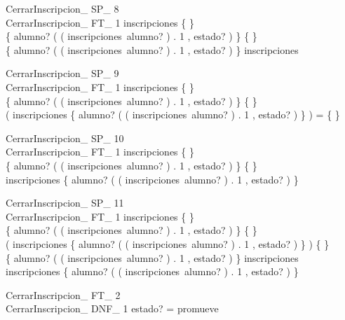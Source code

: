 \documentclass{article}
\begin{document}
 
 \begin{schema}{CerrarInscripcion\_ SP\_ 8}\\
  CerrarInscripcion\_ FT\_ 1 
 \where
  inscripciones \neq \{ \} \\
  \{ alumno? \mapsto ( ( inscripciones~alumno? ) . 1 , estado? ) \} \neq \{ \} \\
  \dom \{ alumno? \mapsto ( ( inscripciones~alumno? ) . 1 , estado? ) \} \subset \dom inscripciones
 \end{schema}
 
 
 \begin{schema}{CerrarInscripcion\_ SP\_ 9}\\
  CerrarInscripcion\_ FT\_ 1 
 \where
  inscripciones \neq \{ \} \\
  \{ alumno? \mapsto ( ( inscripciones~alumno? ) . 1 , estado? ) \} \neq \{ \} \\
  ( \dom inscripciones \cap \dom \{ alumno? \mapsto ( ( inscripciones~alumno? ) . 1 , estado? ) \} ) = \{ \}
 \end{schema}
 
 
 \begin{schema}{CerrarInscripcion\_ SP\_ 10}\\
  CerrarInscripcion\_ FT\_ 1 
 \where
  inscripciones \neq \{ \} \\
  \{ alumno? \mapsto ( ( inscripciones~alumno? ) . 1 , estado? ) \} \neq \{ \} \\
  \dom inscripciones \subset \dom \{ alumno? \mapsto ( ( inscripciones~alumno? ) . 1 , estado? ) \}
 \end{schema}
 
 
 \begin{schema}{CerrarInscripcion\_ SP\_ 11}\\
  CerrarInscripcion\_ FT\_ 1 
 \where
  inscripciones \neq \{ \} \\
  \{ alumno? \mapsto ( ( inscripciones~alumno? ) . 1 , estado? ) \} \neq \{ \} \\
  ( \dom inscripciones \cap \dom \{ alumno? \mapsto ( ( inscripciones~alumno? ) . 1 , estado? ) \} ) \neq \{ \} \\
  \lnot \dom \{ alumno? \mapsto ( ( inscripciones~alumno? ) . 1 , estado? ) \} \subseteq \dom inscripciones \\
  \lnot \dom inscripciones \subseteq \dom \{ alumno? \mapsto ( ( inscripciones~alumno? ) . 1 , estado? ) \}
 \end{schema}
 
 
 \begin{schema}{CerrarInscripcion\_ FT\_ 2}\\
  CerrarInscripcion\_ DNF\_ 1 
 \where
  estado? = promueve
 \end{schema}
 
\end{document}
